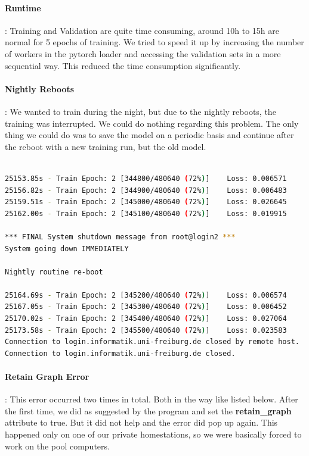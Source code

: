 \documentclass[a4paper]{article}
\begin{document}
	\paragraph{Runtime}: Training and Validation are quite time consuming, around 10h to 15h are normal for 5 epochs of training. We tried to speed it up by increasing the number of workers in the pytorch loader and accessing the validation sets in a more sequential way. This reduced the time consumption significantly.
	\clearpage
	\paragraph{Nightly Reboots}: We wanted to train during the night, but due to the nightly reboots, the training was interrupted. We could do nothing regarding this problem. The only thing we could do was to save the model on a periodic basis and continue after the reboot with a new training run, but the old model.
	
\begin{lstlisting}[language=bash, caption={Nigthly Reboot Interruption}]

25153.85s - Train Epoch: 2 [344800/480640 (72%)]    Loss: 0.006571
25156.82s - Train Epoch: 2 [344900/480640 (72%)]    Loss: 0.006483
25159.51s - Train Epoch: 2 [345000/480640 (72%)]    Loss: 0.026645
25162.00s - Train Epoch: 2 [345100/480640 (72%)]    Loss: 0.019915
                                                                               
*** FINAL System shutdown message from root@login2 ***                       
System going down IMMEDIATELY                                                  
                                                                               
Nightly routine re-boot                                                        
                                                                               
25164.69s - Train Epoch: 2 [345200/480640 (72%)]    Loss: 0.006574
25167.05s - Train Epoch: 2 [345300/480640 (72%)]    Loss: 0.006452
25170.02s - Train Epoch: 2 [345400/480640 (72%)]    Loss: 0.027064
25173.58s - Train Epoch: 2 [345500/480640 (72%)]    Loss: 0.023583
Connection to login.informatik.uni-freiburg.de closed by remote host.
Connection to login.informatik.uni-freiburg.de closed.

\end{lstlisting}

\paragraph{Retain Graph Error}: This error occurred two times in total. Both in the way like listed below. After the first time, we did as suggested by the program and set the \textbf{retain\_graph} attribute to true. But it did not help and the error did pop up again. This happened only on one of our private homestations, so we were basically forced to work on the pool computers.
\end{document}
